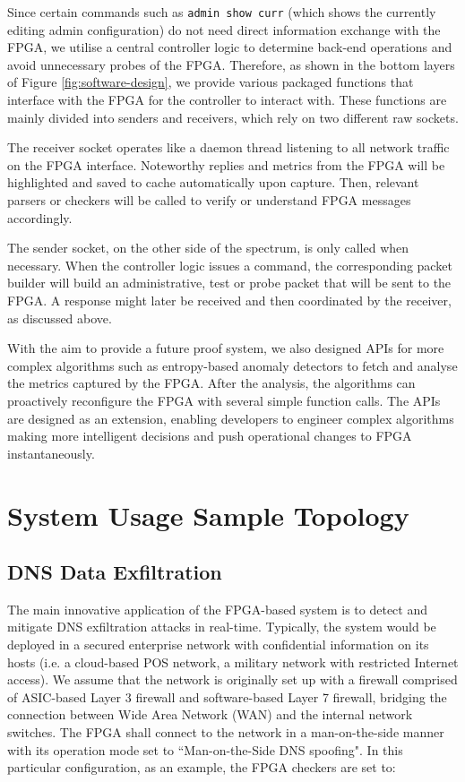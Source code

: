 \documentclass[a4paper]{report}
\newcommand{\code}{\texttt}
\begin{document}
Since certain commands such as \code{admin show curr} (which shows the currently editing admin configuration) do not need direct information exchange with the FPGA, we utilise a central controller logic to determine back-end operations and avoid unnecessary probes of the FPGA. Therefore, as shown in the bottom layers of Figure \ref{fig:software-design}, we provide various packaged functions that interface with the FPGA for the controller to interact with. These functions are mainly divided into senders and receivers, which rely on two different raw sockets.

The receiver socket operates like a daemon thread listening to all network traffic on the FPGA interface. Noteworthy replies and metrics from the FPGA will be highlighted and saved to cache automatically upon capture. Then, relevant parsers or checkers will be called to verify or understand FPGA messages accordingly. 

The sender socket, on the other side of the spectrum, is only called when necessary. When the controller logic issues a command, the corresponding packet builder will build an administrative, test or probe packet that will be sent to the FPGA. A response might later be received and then coordinated by the receiver, as discussed above.

With the aim to provide a future proof system, we also designed APIs for more complex algorithms such as entropy-based anomaly detectors to fetch and analyse the metrics captured by the FPGA. After the analysis, the algorithms can proactively reconfigure the FPGA with several simple function calls. The APIs are designed as an extension, enabling developers to engineer complex algorithms making more intelligent decisions and push operational changes to FPGA instantaneously.

\section{System Usage Sample Topology}
\label{section:design-system-usage-sample}

\subsection{DNS Data Exfiltration}

The main innovative application of the FPGA-based system is to detect and mitigate DNS exfiltration attacks in real-time. Typically, the system would be deployed in a secured enterprise network with confidential information on its hosts (i.e. a cloud-based POS network, a military network with restricted Internet access). We assume that the network is originally set up with a firewall comprised of ASIC-based Layer 3 firewall and software-based Layer 7 firewall, bridging the connection between Wide Area Network (WAN) and the internal network switches. The FPGA shall connect to the network in a man-on-the-side manner with its operation mode set to ``Man-on-the-Side DNS spoofing".  In this particular configuration, as an example, the FPGA checkers are set to:
\end{document}
